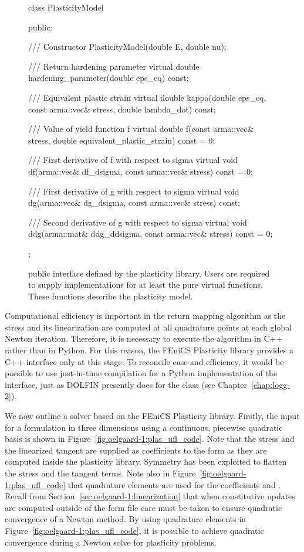\begin{figure}
\bwfig
\begin{c++}
class PlasticityModel
{
public:

  /// Constructor
  PlasticityModel(double E, double nu);

  /// Return hardening parameter
  virtual double hardening_parameter(double eps_eq) const;

  /// Equivalent plastic strain
  virtual double kappa(double eps_eq, const arma::vec& stress,
                       double lambda_dot) const;

  /// Value of yield function f
  virtual double f(const arma::vec& stress,
                   double equivalent_plastic_strain) const = 0;

  /// First derivative of f with respect to sigma
  virtual void df(arma::vec& df_dsigma,
                  const arma::vec& stress) const = 0;

  /// First derivative of g with respect to sigma
  virtual void dg(arma::vec& dg_dsigma,
                  const arma::vec& stress) const;

  /// Second derivative of g with respect to sigma
  virtual void ddg(arma::mat& ddg_ddsigma,
                   const arma::vec& stress) const = 0;

};
\end{c++}
\caption{ public interface defined by the plasticity
library. Users are required to supply implementations for at least the
pure virtual functions. These functions describe the plasticity model.}
\label{fig:oelgaard-1:plasticity_interface}
\end{figure}

Computational efficiency is important in the return mapping algorithm
as the stress and its linearization are computed at all quadrature
points at each global Newton iteration. Therefore, it is necessary to
execute the algorithm in C++ rather than in Python. For this reason, the
FEniCS Plasticity library provides a C++ interface only at this stage.
To reconcile ease and efficiency, it would be possible to use just-in-time
compilation for a Python implementation of the 
interface, just as DOLFIN presently does for the  class
(see Chapter~\ref{chap:logg-2}).

We now outline a solver based on the FEniCS Plasticity library.
Firstly, the \ufl{} input for a formulation in three dimensions
using a continuous, piecewise quadratic basis is shown in
Figure~\ref{fig:oelgaard-1:plas_ufl_code}. Note that the stress
and the linearized tangent are supplied as coefficients to the
form as they are computed inside the plasticity library.  Symmetry
has been exploited to flatten the stress and the tangent terms.
Note also in Figure~\ref{fig:oelgaard-1:plas_ufl_code} that quadrature
elements are used for the coefficients  and .  Recall from
Section~\ref{sec:oelgaard-1:linearization} that when constitutive updates
are computed outside of the form file care must be taken to ensure
quadratic convergence of a Newton method.  By using quadrature elements
in Figure~\ref{fig:oelgaard-1:plas_ufl_code}, it is possible to achieve
quadratic convergence during a Newton solve for plasticity problems.

